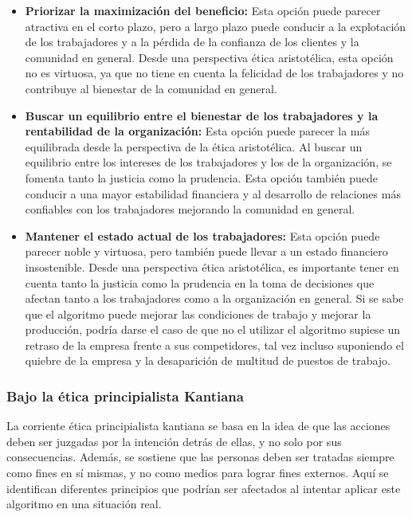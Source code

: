 \begin{itemize}
    \item \textbf{Priorizar la maximización del beneficio:} Esta opción puede parecer 
    atractiva en el corto plazo, pero a largo plazo puede conducir a la explotación de 
    los trabajadores y a la pérdida de la confianza de los clientes y la comunidad en 
    general. Desde una perspectiva ética aristotélica, esta opción no es virtuosa, ya 
    que no tiene en cuenta la felicidad de los trabajadores y no contribuye al bienestar 
    de la comunidad en general.
    \item \textbf{Buscar un equilibrio entre el bienestar de los trabajadores y 
    la rentabilidad de la organización:} Esta opción puede parecer la más equilibrada desde 
    la perspectiva de la ética aristotélica. Al buscar un equilibrio entre los intereses de 
    los trabajadores y los de la organización, se fomenta tanto la justicia como la prudencia. 
    Esta opción también puede conducir a una mayor estabilidad financiera y al desarrollo de 
    relaciones más confiables con los trabajadores mejorando la comunidad en general.
    \item \textbf{Mantener el estado actual de los trabajadores:} Esta opción puede parecer 
    noble y virtuosa, pero también puede llevar a un estado financiero insostenible. Desde 
    una perspectiva ética aristotélica, es importante tener en cuenta tanto la justicia como 
    la prudencia en la toma de decisiones que afectan tanto a los trabajadores como a la 
    organización en general. Si se sabe que el algoritmo puede mejorar las condiciones de 
    trabajo y mejorar la producción, podría darse el caso de que no el utilizar el algoritmo 
    supiese un retraso de la empresa frente a sus competidores, tal vez incluso suponiendo el 
    quiebre de la empresa y la desaparición de multitud de puestos de trabajo.
\end{itemize}

\subsubsection{Bajo la ética principialista Kantiana} 
La corriente ética principialista kantiana se basa en la idea de que las acciones deben 
ser juzgadas por la intención detrás de ellas, y no solo por sus consecuencias. Además, 
se sostiene que las personas deben ser tratadas siempre como fines en sí mismas, y no 
como medios para lograr fines externos. Aquí se identifican diferentes principios que 
podrían ser afectados al intentar aplicar este algoritmo en una situación real. 

